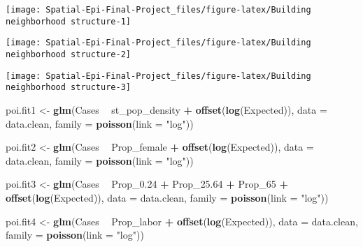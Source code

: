 \documentclass[]{article}
\newenvironment{Shaded}{\begin{snugshade}}{\end{snugshade}}
\newcommand{\DataTypeTok}[1]{\textcolor[rgb]{0.13,0.29,0.53}{#1}}
\newcommand{\DecValTok}[1]{\textcolor[rgb]{0.00,0.00,0.81}{#1}}
\newcommand{\FloatTok}[1]{\textcolor[rgb]{0.00,0.00,0.81}{#1}}
\newcommand{\KeywordTok}[1]{\textcolor[rgb]{0.13,0.29,0.53}{\textbf{#1}}}
\newcommand{\NormalTok}[1]{#1}
\newcommand{\OperatorTok}[1]{\textcolor[rgb]{0.81,0.36,0.00}{\textbf{#1}}}
\newcommand{\StringTok}[1]{\textcolor[rgb]{0.31,0.60,0.02}{#1}}
\begin{document}
\begin{center}\texttt{[image: Spatial-Epi-Final-Project\_files/figure-latex/Building neighborhood structure-1]} \end{center}

\begin{center}\texttt{[image: Spatial-Epi-Final-Project\_files/figure-latex/Building neighborhood structure-2]} \end{center}

\begin{center}\texttt{[image: Spatial-Epi-Final-Project\_files/figure-latex/Building neighborhood structure-3]} \end{center}

\begin{Shaded}
\begin{Highlighting}[]
\NormalTok{poi.fit1 <-}\StringTok{ }\KeywordTok{glm}\NormalTok{(Cases }\OperatorTok{~}\StringTok{ }\NormalTok{st_pop_density }\OperatorTok{+}\StringTok{ }\KeywordTok{offset}\NormalTok{(}\KeywordTok{log}\NormalTok{(Expected)), }
                \DataTypeTok{data =}\NormalTok{ data.clean, }\DataTypeTok{family =} \KeywordTok{poisson}\NormalTok{(}\DataTypeTok{link =} \StringTok{"log"}\NormalTok{))}

\NormalTok{poi.fit2 <-}\StringTok{ }\KeywordTok{glm}\NormalTok{(Cases }\OperatorTok{~}\StringTok{ }\NormalTok{Prop_female }\OperatorTok{+}\StringTok{ }\KeywordTok{offset}\NormalTok{(}\KeywordTok{log}\NormalTok{(Expected)), }
                \DataTypeTok{data =}\NormalTok{ data.clean, }\DataTypeTok{family =} \KeywordTok{poisson}\NormalTok{(}\DataTypeTok{link =} \StringTok{"log"}\NormalTok{))}

\NormalTok{poi.fit3 <-}\StringTok{ }\KeywordTok{glm}\NormalTok{(Cases }\OperatorTok{~}\StringTok{ }\NormalTok{Prop_}\FloatTok{0.24} \OperatorTok{+}\StringTok{ }\NormalTok{Prop_}\FloatTok{25.64} \OperatorTok{+}\StringTok{ }\NormalTok{Prop_}\DecValTok{65} \OperatorTok{+}\StringTok{ }\KeywordTok{offset}\NormalTok{(}\KeywordTok{log}\NormalTok{(Expected)), }
                \DataTypeTok{data =}\NormalTok{ data.clean, }\DataTypeTok{family =} \KeywordTok{poisson}\NormalTok{(}\DataTypeTok{link =} \StringTok{"log"}\NormalTok{))}

\NormalTok{poi.fit4 <-}\StringTok{ }\KeywordTok{glm}\NormalTok{(Cases }\OperatorTok{~}\StringTok{ }\NormalTok{Prop_labor }\OperatorTok{+}\StringTok{ }\KeywordTok{offset}\NormalTok{(}\KeywordTok{log}\NormalTok{(Expected)), }
                \DataTypeTok{data =}\NormalTok{ data.clean, }\DataTypeTok{family =} \KeywordTok{poisson}\NormalTok{(}\DataTypeTok{link =} \StringTok{"log"}\NormalTok{))}


\end{Highlighting}
\end{Shaded}
\end{document}
